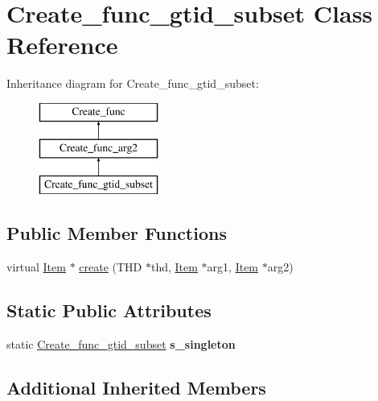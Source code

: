 \hypertarget{classCreate__func__gtid__subset}{}\section{Create\+\_\+func\+\_\+gtid\+\_\+subset Class Reference}
\label{classCreate__func__gtid__subset}
Inheritance diagram for Create\+\_\+func\+\_\+gtid\+\_\+subset\+:\begin{figure}[H]
\begin{center}
\leavevmode
\includegraphics[height=3.000000cm]{classCreate__func__gtid__subset}
\end{center}
\end{figure}
\subsection*{Public Member Functions}
\begin{DoxyCompactItemize}
\item 
virtual \mbox{\hyperlink{classItem}{Item}} $\ast$ \mbox{\hyperlink{classCreate__func__gtid__subset_aa47de63d0800bd253e0f4ac293001758}{create}} (T\+HD $\ast$thd, \mbox{\hyperlink{classItem}{Item}} $\ast$arg1, \mbox{\hyperlink{classItem}{Item}} $\ast$arg2)
\end{DoxyCompactItemize}
\subsection*{Static Public Attributes}
\begin{DoxyCompactItemize}
\item 
\mbox{\label{classCreate__func__gtid__subset_adcd0b6b20e639c06c78e27fafca2633e}} 
static \mbox{\hyperlink{classCreate__func__gtid__subset}{Create\+\_\+func\+\_\+gtid\+\_\+subset}} {\bfseries s\+\_\+singleton}
\end{DoxyCompactItemize}
\subsection*{Additional Inherited Members}


